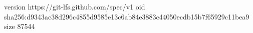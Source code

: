 version https://git-lfs.github.com/spec/v1
oid sha256:d9343ac38d296c4855d9585e13c6ab84e3883c44050ecdb15b7f65929c11bea9
size 87544
